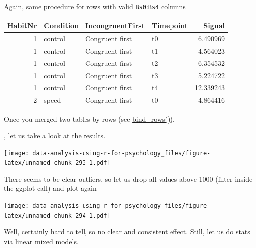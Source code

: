 \documentclass[
]{book}
\begin{document}
Again, same procedure for rows with valid \texttt{Bs0}:\texttt{Bs4} columns

\begin{tabular}{r|l|l|l|r}
\hline
HabitNr & Condition & IncongruentFirst & Timepoint & Signal\\
\hline
1 & control & Congruent first & t0 & 6.490969\\
\hline
1 & control & Congruent first & t1 & 4.564023\\
\hline
1 & control & Congruent first & t2 & 6.354532\\
\hline
1 & control & Congruent first & t3 & 5.224722\\
\hline
1 & control & Congruent first & t4 & 12.339243\\
\hline
2 & speed & Congruent first & t0 & 4.864416\\
\hline
\end{tabular}

Once you merged two tables by rows (see \href{https://dplyr.tidyverse.org/reference/bind.html}{bind\_rows()}).

, let us take a look at the results.

\texttt{[image: data-analysis-using-r-for-psychology\_files/figure-latex/unnamed-chunk-293-1.pdf]}

There seems to be clear outliers, so let us drop all values above 1000 (filter inside the ggplot call) and plot again

\texttt{[image: data-analysis-using-r-for-psychology\_files/figure-latex/unnamed-chunk-294-1.pdf]}

Well, certainly hard to tell, so no clear and consistent effect. Still, let us do stats via linear mixed models.
\end{document}
